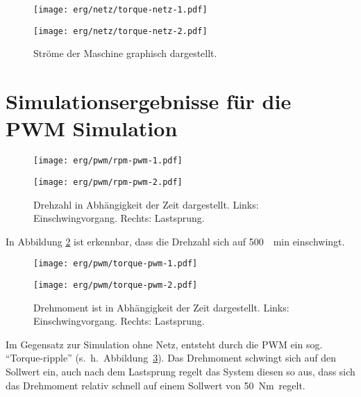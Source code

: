 \begin{figure}[h!]
	\begin{minipage}[t]{0.5\textwidth}
		\texttt{[image: erg/netz/torque-netz-1.pdf]}
	\end{minipage}
	\begin{minipage}[t]{0.5\textwidth} 
		\texttt{[image: erg/netz/torque-netz-2.pdf]}
	\end{minipage}
	\caption{Ströme der Maschine graphisch dargestellt.}
	\label{fig:mi-netz}
\end{figure}

\newpage

\section{Simulationsergebnisse für die PWM Simulation}\label{sec:sim-pwm}

\begin{figure}[h!]
	\begin{minipage}[t]{0.5\textwidth}
		\texttt{[image: erg/pwm/rpm-pwm-1.pdf]}
	\end{minipage}
	\begin{minipage}[t]{0.5\textwidth} 
		\texttt{[image: erg/pwm/rpm-pwm-2.pdf]}
	\end{minipage}
	\caption{Drehzahl in Abhängigkeit der Zeit dargestellt. Links: Einschwingvorgang. Rechts: Lastsprung.}
	\label{fig:n-pwm}
\end{figure}

In Abbildung \ref{fig:n-pwm} ist erkennbar, dass die Drehzahl sich auf \SI{500}{\per\minute} einschwingt.

\begin{figure}[h!]
	\begin{minipage}[t]{0.5\textwidth}
		\texttt{[image: erg/pwm/torque-pwm-1.pdf]}
	\end{minipage}
	\begin{minipage}[t]{0.5\textwidth} 
		\texttt{[image: erg/pwm/torque-pwm-2.pdf]}
	\end{minipage}
	\caption{Drehmoment ist in Abhängigkeit der Zeit dargestellt. Links: Einschwingvorgang. Rechts: Lastsprung.}
	\label{fig:mi-pwm}
\end{figure}

Im Gegensatz zur Simulation ohne Netz, entsteht durch die PWM ein sog. \enquote{Torque-ripple} (s.~h.~Abbildung~\ref{fig:mi-pwm}).
Das Drehmoment schwingt sich auf den Sollwert ein, auch nach dem Lastsprung regelt das System diesen so aus, dass sich das Drehmoment relativ schnell auf einem Sollwert von \SI{50}Nm regelt.

